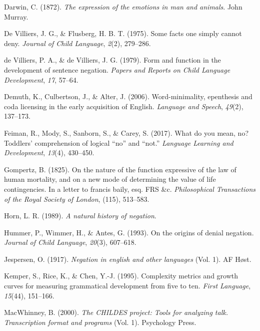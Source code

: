 \documentclass[
  man,floatsintext]{apa6}
\newlength{\cslhangindent}
\newlength{\cslentryspacingunit} %
\newenvironment{CSLReferences}[2] %
 {%
  \setlength{\parindent}{0pt}
  \ifodd #1
  \let\oldpar\par
  \def\par{\hangindent=\cslhangindent\oldpar}
  \fi
  \setlength{\parskip}{#2\cslentryspacingunit}
 }%
 {}
\begin{document}
\begin{CSLReferences}{1}{0}
\leavevmode{}%
Darwin, C. (1872). \emph{The expression of the emotions in man and animals}. John Murray.

\leavevmode{}%
De Villiers, J. G., \& Flusberg, H. B. T. (1975). Some facts one simply cannot deny. \emph{Journal of Child Language}, \emph{2}(2), 279--286.

\leavevmode{}%
de Villiers, P. A., \& de Villiers, J. G. (1979). Form and function in the development of sentence negation. \emph{Papers and Reports on Child Language Development}, \emph{17}, 57--64.

\leavevmode{}%
Demuth, K., Culbertson, J., \& Alter, J. (2006). Word-minimality, epenthesis and coda licensing in the early acquisition of {E}nglish. \emph{Language and Speech}, \emph{49}(2), 137--173.

\leavevmode{}%
Feiman, R., Mody, S., Sanborn, S., \& Carey, S. (2017). What do you mean, no? Toddlers' comprehension of logical {``no''} and {``not.''} \emph{Language Learning and Development}, \emph{13}(4), 430--450.

\leavevmode{}%
Gompertz, B. (1825). On the nature of the function expressive of the law of human mortality, and on a new mode of determining the value of life contingencies. In a letter to francis baily, esq. FRS \&c. \emph{Philosophical Transactions of the Royal Society of London}, (115), 513--583.

\leavevmode{}%
Horn, L. R. (1989). \emph{A natural history of negation}.

\leavevmode{}%
Hummer, P., Wimmer, H., \& Antes, G. (1993). On the origins of denial negation. \emph{Journal of Child Language}, \emph{20}(3), 607--618.

\leavevmode{}%
Jespersen, O. (1917). \emph{Negation in english and other languages} (Vol. 1). AF H{ø}st.

\leavevmode{}%
Kemper, S., Rice, K., \& Chen, Y.-J. (1995). Complexity metrics and growth curves for measuring grammatical development from five to ten. \emph{First Language}, \emph{15}(44), 151--166.

\leavevmode{}%
MacWhinney, B. (2000). \emph{The CHILDES project: Tools for analyzing talk. Transcription format and programs} (Vol. 1). Psychology Press.


\end{CSLReferences}
\end{document}
